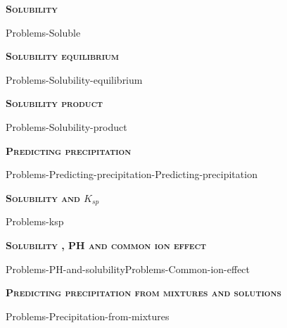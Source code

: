 \documentclass[main.tex]{subfiles}
\begin{document}
\newcommand\chapterlabel{Ch-solubility}
\newpage
{}
\fancyhfoffset[E,O]{0pt}
\setlength{\columnsep}{30pt}
\begin{conclusion}
\iftoggle{chem121}{}{\setcounter{chapter}{6}}
\end{conclusion}
\begin{multicols*}{2}\setcounter{numA}{1}  %

{\raggedright\textsc{\textbf{Solubility }}\par} {Problems-Soluble}
 
{\raggedright\textsc{\textbf{Solubility equilibrium}}\par}{Problems-Solubility-equilibrium}

{\raggedright\textsc{\textbf{Solubility product}}\par} {Problems-Solubility-product}
{\raggedright\textsc{\textbf{Predicting precipitation}}\par} {Problems-Predicting-precipitation-Predicting-precipitation}
 {\raggedright\textsc{\textbf{Solubility and $K_{sp}$}}\par} {Problems-ksp}
 {\raggedright\textsc{\textbf{Solubility , PH and common ion effect}}\par} {Problems-PH-and-solubility}{Problems-Common-ion-effect}

   {\raggedright\textsc{\textbf{Predicting precipitation from mixtures and solutions}}\par} {Problems-Precipitation-from-mixtures}


\end{multicols*} \iftoggle{showfinalanswers}{
\newpage\fancyhfoffset[E,O]{0pt}
\begin{answerbox}
\begin{answersenvironment}
 \begin{localsize}{10}
{ \checkoddpage\ifoddpage    \else   \clearpage\thispagestyle{empty}\mbox{}\clearpage\fi
\Large \bf Answers}
\SetupExSheets{ headings = inline-nr , counter-format = qu) ,}
\providetoggle{printOddAnswers}\settoggle{printOddAnswers}{\printOddAnswers}\iftoggle{printOddAnswers}{\printsolutions[section] }{\printsolutions}
  \vspace{20cm}
 \end{localsize}
 \end{answersenvironment}
\end{answerbox}
}{}
\checkoddpage\ifoddpage   \clearpage\thispagestyle{empty}\mbox{}\clearpage \else   \fi
\end{document}
